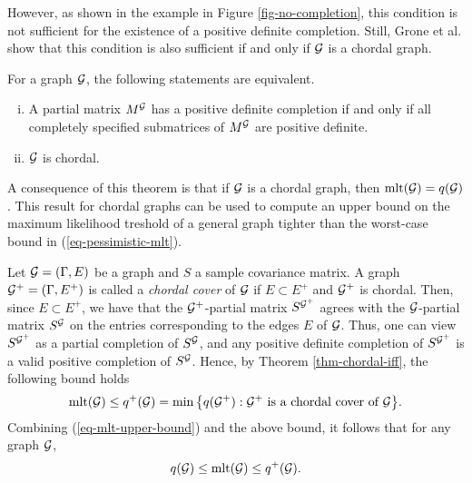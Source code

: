 

However, as shown in the example in Figure \ref{fig-no-completion}, this condition is not sufficient for the existence of a positive definite completion. Still, Grone et al. \cite{GRONE1984109} show that this condition is also sufficient if and only if ${\mathcal{G}}$ is a chordal graph.
\begin{theorem} \label{thm-chordal-iff}
    For a graph ${\mathcal{G}}$, the following statements are equivalent.
    \begin{enumerate}[i.]
        \item A partial matrix $M^{\mathcal{G}}$ has a positive definite completion if and only if all completely specified submatrices of $M^{\mathcal{G}}$ are positive definite.
        \item ${\mathcal{G}}$ is chordal.
    \end{enumerate}
\end{theorem}
A consequence of this theorem is that if ${\mathcal{G}}$ is a chordal graph, then ${\textrm{mlt}}({\mathcal{G}}) = q({\mathcal{G}})$. This result for chordal graphs can be used to compute an upper bound on the maximum likelihood treshold of a general graph tighter than the worst-case bound in (\ref{eq-pessimistic-mlt}). 

Let ${\mathcal{G}} = (\Gamma, E)$ be a graph and $S$ a sample covariance matrix. A graph ${\mathcal{G}}^+ = (\Gamma, E^+)$ is called a \textit{chordal cover} of ${\mathcal{G}}$ if $E \subset E^+$ and ${\mathcal{G}}^+$ is chordal. Then, since $E \subset E^+$, we have that the ${\mathcal{G}}^+$-partial matrix $S^{{\mathcal{G}}^+}$ agrees with the ${\mathcal{G}}$-partial matrix $S^{\mathcal{G}}$ on the entries corresponding to the edges $E$ of ${\mathcal{G}}$. Thus, one can view $S^{{\mathcal{G}}^+}$ as a partial completion of $S^{\mathcal{G}}$, and any positive definite completion of $S^{{\mathcal{G}}^+}$ is a valid positive completion of $S^{\mathcal{G}}$. Hence, by Theorem \ref{thm-chordal-iff}, the following bound holds
\begin{equation*}
    {\textrm{mlt}}({\mathcal{G}}) \leq q^+({\mathcal{G}}) = \min {\left\{ q({\mathcal{G}}^+) : {\mathcal{G}}^+ {\textrm{ is a chordal cover of }} {\mathcal{G}}\right\}}.
\end{equation*}
Combining (\ref{eq-mlt-upper-bound}) and the above bound, it follows that for any graph ${\mathcal{G}}$,
\begin{equation} \label{eq-mlt-bounds}
    q({\mathcal{G}}) \leq {\textrm{mlt}}({\mathcal{G}}) \leq q^+({\mathcal{G}}).
\end{equation}



